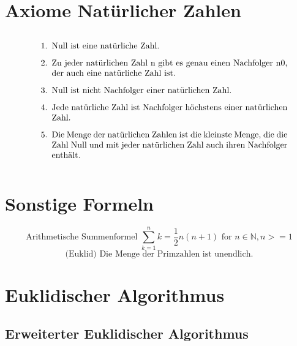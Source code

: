 \documentclass[../Main.tex]{subfiles}
\begin{document}
\section{Axiome Natürlicher Zahlen}
\begin{equation}
    \parbox{30em}{
        \begin{enumerate}
            \item Null ist eine natürliche Zahl.
            \item Zu jeder natürlichen Zahl n gibt es genau einen Nachfolger n0, der auch eine 
            natürliche Zahl ist.
            \item Null ist nicht Nachfolger einer natürlichen Zahl. 
            \item Jede natürliche Zahl ist Nachfolger höchstens einer natürlichen Zahl.
            \item Die Menge der natürlichen Zahlen ist die kleinste Menge, die die Zahl Null und 
            mit jeder natürlichen Zahl auch ihren Nachfolger enthält.
        \end{enumerate}
    }
\end{equation}

\section{Sonstige Formeln}
\begin{equation}
    \text{Arithmetische Summenformel } \sum_{k=1}^{n}{k} = \frac{1}{2} n (n+1) \text{ for } n \in \mathbb{N}, n >= 1
\end{equation}
\begin{equation}
    \text{(Euklid) Die Menge der Primzahlen ist unendlich.}
\end{equation}

\section{Euklidischer Algorithmus}
\subsection{Erweiterter Euklidischer Algorithmus}
\end{document}
